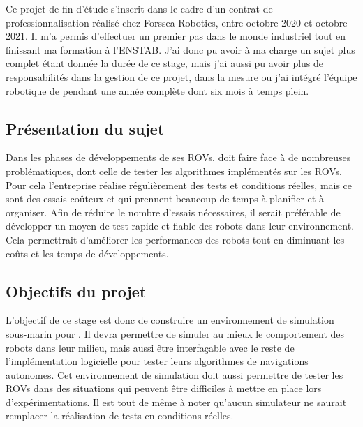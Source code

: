 			Ce projet de fin d'étude s'inscrit dans le cadre d'un contrat de professionnalisation réalisé chez Forssea Robotics, entre octobre 2020 et octobre 2021. Il m'a permis d'effectuer un premier pas dans le monde industriel tout en finissant ma formation à l'\gls{ENSTAB}. J'ai donc pu avoir à ma charge un sujet plus complet étant donnée la durée de ce stage, mais j'ai aussi pu avoir plus de responsabilités dans la gestion de ce projet, dans la mesure ou j'ai intégré l'équipe robotique de \forssea{} pendant une année complète dont six mois à temps plein.

		\subsection{Présentation du sujet}

			Dans les phases de développements de ses \gls{ROV}s, \forssea{} doit faire face à de nombreuses problématiques, dont celle de tester les algorithmes implémentés sur les \gls{ROV}s. Pour cela l'entreprise réalise régulièrement des tests et conditions réelles, mais ce sont des essais coûteux et qui prennent beaucoup de temps à planifier et à organiser. Afin de réduire le nombre d'essais nécessaires, il serait préférable de développer un moyen de test rapide et fiable des robots dans leur environnement. Cela permettrait d'améliorer les performances des robots tout en diminuant les coûts et les temps de développements.

		\subsection{Objectifs du projet}

			L'objectif de ce stage est donc de construire un environnement de simulation sous-marin pour \forssea{}. Il devra permettre de simuler au mieux le comportement des robots dans leur milieu, mais aussi être interfaçable avec le reste de l'implémentation logicielle pour tester leurs algorithmes de navigations autonomes. Cet environnement de simulation doit aussi permettre de tester les \gls{ROV}s dans des situations qui peuvent être difficiles à mettre en place lors d'expérimentations. Il est tout de même à noter qu'aucun simulateur ne saurait remplacer la réalisation de tests en conditions réelles.

	